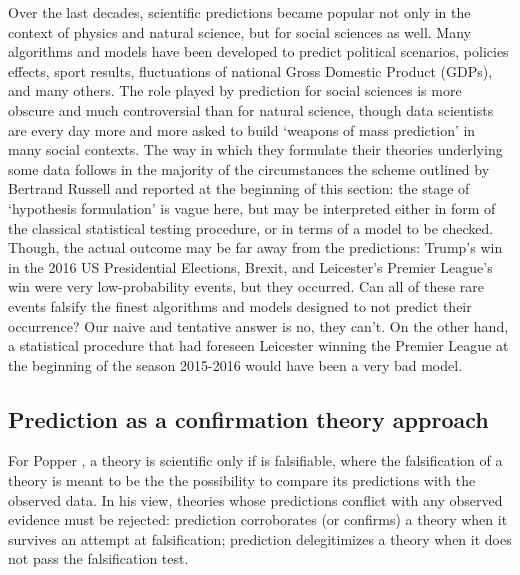 \documentclass{statsoc}
\begin{document}
Over the last decades, scientific predictions became popular not only in the context of physics and natural science, but for social sciences as well. Many algorithms and models 
have been developed to predict political scenarios, policies effects, sport results, fluctuations of national Gross Domestic Product (GDPs), and many others. The role played by 
prediction for social sciences is more obscure \citep{popper1944poverty, popper1945poverty} and much controversial than for natural science, though data scientists are every day more and more asked to build 
`weapons of mass prediction' in many social contexts. The way in which they formulate their theories underlying  some data follows in the majority of the circumstances the scheme 
outlined by Bertrand Russell and reported at the beginning of this section: the stage of `hypothesis formulation' is vague here, but may be interpreted either in form of the 
classical statistical testing procedure, or in terms of a model to be checked. Though, the actual outcome may be far away from the predictions: Trump's win in the 2016 US 
Presidential Elections, Brexit, and Leicester's Premier League's win were very low-probability events, but they occurred. Can all of these rare events falsify the finest algorithms and models designed to not predict their occurrence? Our naive and tentative answer is no, they can't. On the other hand, a statistical procedure that had foreseen Leicester winning the Premier League at the beginning of the season 2015-2016 would have been a very bad model.




\subsection{Prediction as a confirmation theory approach}


For Popper \citep{popper1934logic}, a theory is scientific only if is falsifiable, where the falsification of a theory is meant to be the the possibility to compare its predictions 
with the observed data. In his view, theories whose predictions conflict with any observed evidence must be rejected: prediction corroborates (or confirms) a theory when it survives 
an attempt at falsification; prediction delegitimizes a theory when it does not pass the falsification test.
\end{document}
